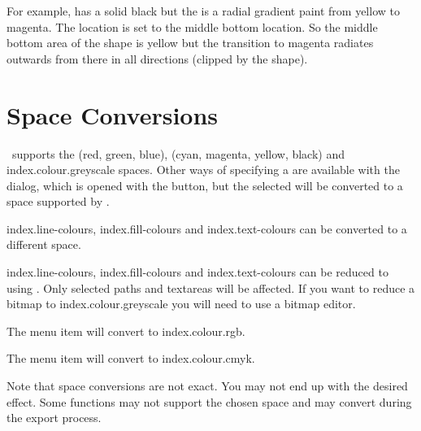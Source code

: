 For example,  has a solid black
 but the  is a radial
gradient paint from yellow to magenta. The location is set to the
middle bottom location. So the middle bottom area of the \gls{shape}
is yellow but the transition to magenta radiates outwards from there
in all directions (clipped by the shape).


\section{ Space Conversions}\label{sec:convertcolspace}


\FlowframTk\ supports the
 (red, green, blue),
 (cyan, magenta, yellow, black) and
\gls{index.colour.greyscale}  spaces.
Other ways of specifying a  are available with
the  dialog, which is opened with the 
button, but the selected  will be converted
to a  space supported by \FlowframTk.

\Glspl{index.line-colour}, \glspl{index.fill-colour} and
\glspl{index.text-colour} can be converted to a different
 space.


\Glspl{index.line-colour}, \glspl{index.fill-colour} and
\glspl{index.text-colour} can be reduced to
 using
.  Only selected \glspl{path} and
\glspl{textarea} will be affected. If you want to reduce a
\gls{bitmap} to \gls{index.colour.greyscale} you will need to use a
bitmap editor.


The  menu item will convert to
\gls{index.colour.rgb}.


The  menu item will convert to
\gls{index.colour.cmyk}.

\begin{warning}
Note that  space conversions are not exact. You may
not end up with the desired effect. Some  functions
may not support the chosen  space and may convert
during the export process.
\end{warning}

